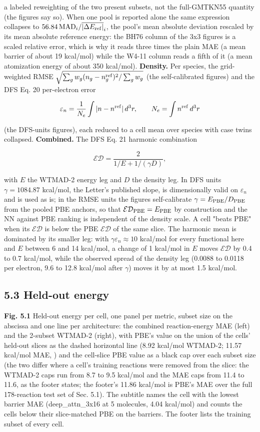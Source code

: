 \documentclass[10pt,a4paper]{article}
\begin{document}
a labeled reweighting of the two present subsets, not the full-GMTKN55 quantity (the figures say so). When one pool is reported alone the same expression collapses to $56.84\, \mathrm{MAD}_i / \overline{|\Delta E_{\rm ref}|}_i$, the pool's mean absolute deviation rescaled by its mean absolute reference energy: the BH76 column of the 3x3 figures is a scaled relative error, which is why it reads three times the plain MAE (a mean barrier of about 19 kcal/mol) while the W4-11 column reads a fifth of it (a mean atomization energy of about 350 kcal/mol). \textbf{Density.} Per species, the grid-weighted RMSE $\sqrt{\sum_g w_g (n_g - n_g^{\rm ref})^2 / \sum_g w_g}$ (the self-calibrated figures) and the DFS Eq. 20 per-electron error

\[
\varepsilon_n = \frac{1}{N_e}\int |n - n^{\rm ref}|\, d^3r, \qquad N_e = \int n^{\rm ref}\, d^3r
\]

(the DFS-units figures), each reduced to a cell mean over species with case twins collapsed. \textbf{Combined.} The DFS Eq. 21 harmonic combination

\[
\mathcal{ED} = \frac{2}{1/E + 1/(\gamma D)},
\]

with $E$ the WTMAD-2 energy leg and $D$ the density leg. In DFS units $\gamma = 1084.87$ kcal/mol, the Letter's published slope, is dimensionally valid on $\varepsilon_n$ and is used as is; in the RMSE units the figures self-calibrate $\gamma = E_{\rm PBE}/D_{\rm PBE}$ from the pooled PBE anchors, so that $\mathcal{ED}_{\rm PBE} = E_{\rm PBE}$ by construction and the NN against PBE ranking is independent of the density scale. A cell "beats PBE" when its $\mathcal{ED}$ is below the PBE $\mathcal{ED}$ of the same slice. The harmonic mean is dominated by its smaller leg: with $\gamma \varepsilon_n \approx 10$ kcal/mol for every functional here and $E$ between 6 and 14 kcal/mol, a change of 1 kcal/mol in $E$ moves $\mathcal{ED}$ by 0.4 to 0.7 kcal/mol, while the observed spread of the density leg (0.0088 to 0.0118 per electron, 9.6 to 12.8 kcal/mol after $\gamma$) moves it by at most 1.5 kcal/mol.

\subsection*{5.3 Held-out energy}

\textbf{Fig. 5.1} Held-out energy per cell, one panel per metric, subset size on the abscissa and one line per architecture: the combined reaction-energy MAE (left) and the 2-subset WTMAD-2 (right), with PBE's value on the union of the cells' held-out slices as the dashed horizontal line (8.92 kcal/mol WTMAD-2; 11.57 kcal/mol MAE, ) and the cell-slice PBE value as a black cap over each subset size (the two differ where a cell's training reactions were removed from the slice: the WTMAD-2 caps run from 8.7 to 9.5 kcal/mol and the MAE caps from 11.4 to 11.6, as the footer states; the footer's 11.86 kcal/mol is PBE's MAE over the full 178-reaction test set of Sec. 5.1). The subtitle names the cell with the lowest barrier MAE (deep\_attn\_3x16 at 5 molecules, 4.04 kcal/mol) and counts the cells below their slice-matched PBE on the barriers. The footer lists the training subset of every cell.
\end{document}
